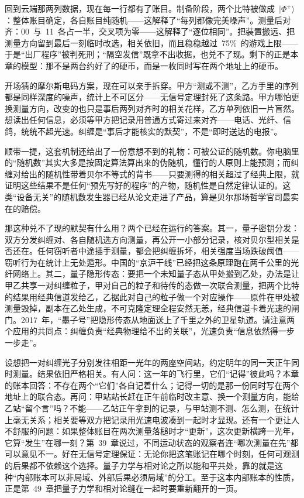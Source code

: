 
回到云端那两列数据，现在每一行都有了账目。制备阶段，两个比特被做成~\(|\Phi^{+}\rangle\)：整体账目确定，各自账目纯随机——这解释了“每列都像完美噪声”。测量后对齐：00~与~11~各占一半，交叉项为零——这解释了“逐位相同”。把装置搬远、把测量方向留到最后一刻临时改选，相关依旧，而且稳稳越过~75\%~的游戏上限——于是“出厂程序”被判死刑；“隔空发信”既拿不出收据，也兑不了现。剩下的正是本章的模型：那不是两台约好了的硬币，而是一枚同时写在两个地址上的硬币。

开场猜的摩尔斯电码方案，现在可以亲手拆穿。甲方“测或不测”，乙方手里的序列都是同样深度的噪声，统计上不可区分——无信号定理封死了这条路。甲方哪怕更换测量方向，改变的也只是事后两列对齐时的相关花样，乙方单列依旧一片盲然。想读出任何信息，必须等甲方把记录用普通方式寄过来对齐——电话、光纤、信鸽，统统不超光速。纠缠是“事后才能核实的默契”，不是“即时送达的电报”。

顺带一提，这套机制还给出了一份意想不到的礼物：可被公证的随机数。你电脑里的“随机数”其实大多是按固定算法算出来的伪随机，懂行的人原则上能预测；而纠缠对给出的随机性带着贝尔不等式的背书——只要测得的相关超过了经典上限，就证明这些结果不是任何“预先写好的程序”的产物，随机性是自然定律认证的。这类“设备无关”的随机数发生器已经从论文走进了产品，算是贝尔那场哲学官司最实在的赔偿。

那这种兑不了现的默契有什么用？两个已经在运行的答案。其一，量子密钥分发：双方分发纠缠对、各自随机选方向测量，再公开一小部分记录，核对贝尔型相关是否还在。任何窃听者中途插手测量，都会把纠缠拆坏，相关强度当场跌破阈值——窃听行为在统计上无处遁形。中国的“京沪干线”已经把这条原理跑在两千公里的光纤网络上。其二，量子隐形传态：要把一个未知量子态从甲处搬到乙处，办法是让甲乙共享一对纠缠粒子，甲对自己的粒子和待传的态做一次联合测量，把两个比特的结果用经典信道发给乙，乙据此对自己的粒子做一个对应操作——原件在甲处被测量毁掉，副本在乙处生成，不可克隆定理全程安然无恙，经典信道卡着光速的闸门。2017~年，“墨子号”把隐形传态从地面送上了千里之外的卫星轨道。请注意两个应用的共同点：纠缠负责“经典物理给不出的关联”，光速负责“信息依然得一步一步走”。


\begin{thought}[把账本写到星系两端]
设想把一对纠缠光子分别发往相距一光年的两座空间站，约定明年的同一天正午同时测量。结果依旧严格相关。有人问：这一年的飞行里，它们“记得”彼此吗？本章的账本回答：不存在两个“它们”各自记着什么；记得一切的是那一份同时写在两个地址上的联合态。再问：甲站站长赶在正午前临时改主意、换一个测量方向，能给乙站“留个言”吗？不能——乙站正午拿到的记录，与甲站测不测、怎么测，在统计上毫无关系；相关要等双方把记录用光速电波凑到一起时才显现。还有一个更让人不舒服的问题：如果整体账目在两次测量落槌时才“更新”，这次更新横跨一光年，它算“发生”在哪一刻？第~39~章说过，不同运动状态的观察者连“哪次测量在先”都可以意见不一。好在无信号定理保证：无论你把这笔账记在哪个时刻，任何可观测的后果都不依赖这个选择。量子力学与相对论之所以能和平共处，靠的就是这种“内部账本可以非局域、外部后果必须局域”的分工。至于这本内部账本的性质，正是第~49~章把量子力学和相对论缝在一起时要重新翻开的一页。
\end{thought}

